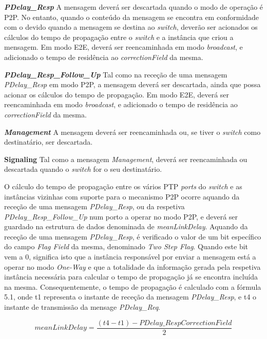 \textbf{\textit{PDelay\_Resp}} A mensagem deverá ser descartada quando o modo de operação é P2P. No entanto, quando o conteúdo da mensagem se encontra em conformidade com o devido quando a mensagem se destina ao \textit{switch}, deverão ser acionados os cálculos do tempo de propagação entre o \textit{switch} e a instância que criou a mensagem. Em modo E2E, deverá ser reencaminhada em modo \textit{broadcast}, e adicionado o tempo de residência ao \textit{correctionField} da mesma. 

\textbf{\textit{PDelay\_Resp\_Follow\_Up}} Tal como na receção de uma mensagem \textit{PDelay\_Resp} em modo P2P, a mensagem deverá ser descartada, ainda que possa acionar os cálculos do tempo de propagação. Em modo E2E, deverá ser reencaminhada em modo \textit{broadcast}, e adicionado o tempo de residência ao \textit{correctionField} da mesma.

\textbf{\textit{Management}} A mensagem deverá ser reencaminhada ou, se tiver o \textit{switch} como destinatário, ser descartada. \par

\textbf{Signaling} Tal como a mensagem \textit{Management}, deverá ser reencaminhada ou descartada quando o \textit{switch} for o seu destinatário. \par

O cálculo do tempo de propagação entre os vários PTP \textit{ports} do \textit{switch} e as instâncias vizinhas com suporte para o mecanismo P2P ocorre aquando da receção de uma mensagem \textit{PDelay\_Resp}, ou da respetiva \textit{PDelay\_Resp\_Follow\_Up} num porto a operar no modo P2P, e deverá ser guardado na estrutura de dados denominada de \textit{meanLinkDelay}. Aquando da receção de uma mensagem \textit{PDelay\_Resp}, é verificado o valor de um bit específico do campo \textit{Flag Field} da mesma, denominado \textit{Two Step Flag}. Quando este bit vem a 0, significa isto que a instância responsável por enviar a mensagem está a operar no modo \textit{One-Way} e que a totalidade da informação gerada pela respetiva instância necessária para calcular o tempo de propagação já se encontra incluída na mesma. Consequentemente, o tempo de propagação é calculado com a fórmula 5.1, onde t1 representa o instante de receção da mensagem \textit{PDelay\_Resp}, e t4 o instante de transmissão da mensage \textit{PDelay\_Req}.

\begin{equation}
    meanLinkDelay = \dfrac{(t4 - t1) - PDelay\_RespCorrectionField}{2} 
\end{equation}

